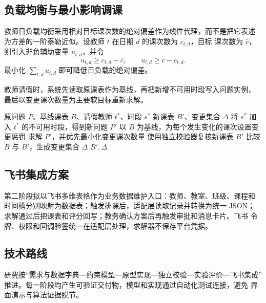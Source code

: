 \subsection{负载均衡与最小影响调课}

教师日负载均衡采用相对目标课次数的绝对偏差作为线性代理，而不是把它表述
为方差的一阶泰勒近似。设教师 $t$ 在日期 $d$ 的课次数为 $c_{t,d}$，目标
课次数为 $\bar c$，则引入非负辅助变量 $u_{t,d}$，并令
\[
  u_{t,d}\geq c_{t,d}-\bar c,\qquad
  u_{t,d}\geq \bar c-c_{t,d}.
\]
最小化 $\sum_{t,d}u_{t,d}$ 即可降低日负载的绝对偏差。

教师请假时，系统先读取原课表作为基线，再把新增不可用时段写入问题实例，
最后以变更课次数量为主要软目标重新求解。

\begin{algorithm}[htbp]
  \caption{最小影响调课流程}
  \label{alg:min-change-new}
  \begin{algorithmic}[1]
    \Require 原问题 $P$、基线课表 $B$、请假教师 $t^*$、时段 $s^*$
    \Ensure 新课表 $B'$、变更集合 $\Delta$
    \State 将 $s^*$ 加入 $t^*$ 的不可用时段，得到新问题 $P'$
    \State 以 $B$ 为基线，为每个发生变化的课次设置变更惩罚
    \State 求解 $P'$，并优先最小化变更课次数量
    \State 使用独立校验器复核新课表 $B'$
    \State 比较 $B$ 与 $B'$，生成变更集合 $\Delta$
    \State \Return $B',\Delta$
  \end{algorithmic}
\end{algorithm}

\subsection{飞书集成方案}

第二阶段拟以飞书多维表格作为业务数据维护入口：教师、教室、班级、课程和
时间槽分别映射为数据表；触发排课后，适配层读取记录并转换为统一 JSON；
求解通过后把课表和评分回写；教务确认方案后再触发审批和消息卡片。飞书
令牌、权限和回调验签统一在适配层处理，求解器不保存平台凭据。

\subsection{技术路线}

研究按“需求与数据字典—约束模型—原型实现—独立校验—实验评价—飞书集成”
推进。每一阶段均产生可验证交付物，模型和实现通过自动化测试连接，避免
界面演示与算法证据脱节。
